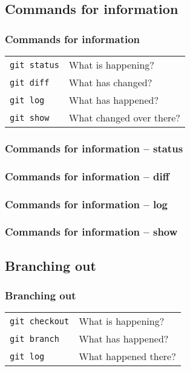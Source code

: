 \documentclass{beamer}
\begin{document}
\subsection{Commands for information}

\begin{frame}[fragile]
  \frametitle{Commands for information}

  \begin{tabular}{ll}
    \texttt{git status} & What is happening? \\
    \texttt{git diff} & What has changed? \\
    \texttt{git log} & What has happened? \\
    \texttt{git show} & What changed over there? \\
  \end{tabular}

\end{frame}

\begin{frame}
  \frametitle{Commands for information -- status}
\end{frame}

\begin{frame}
  \frametitle{Commands for information -- diff}
\end{frame}

\begin{frame}
  \frametitle{Commands for information -- log}
\end{frame}

\begin{frame}
  \frametitle{Commands for information -- show}
\end{frame}

\subsection{Branching out}

\begin{frame}[fragile]
  \frametitle{Branching out}

  \begin{tabular}{ll}
    \texttt{git checkout} & What is happening? \\
    \texttt{git branch} & What has happened? \\
    \texttt{git log} & What happened there? \\
  \end{tabular}

\end{frame}
\end{document}
